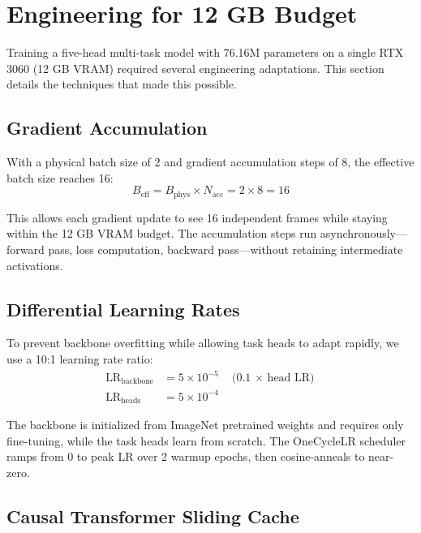 \documentclass[10pt,twocolumn]{article}
\begin{document}
\FloatBarrier

\section{Engineering for 12 GB Budget}
\label{sec:engineering}

Training a five-head multi-task model with 76.16M parameters on a single RTX 3060 (12 GB VRAM) required several engineering adaptations. This section details the techniques that made this possible.

\subsection{Gradient Accumulation}

With a physical batch size of 2 and gradient accumulation steps of 8, the effective batch size reaches 16:
\begin{equation}
B_{\text{eff}} = B_{\text{phys}} \times N_{\text{acc}} = 2 \times 8 = 16
\label{eq:batch}
\end{equation}

This allows each gradient update to see 16 independent frames while staying within the 12 GB VRAM budget. The accumulation steps run asynchronously---forward pass, loss computation, backward pass---without retaining intermediate activations.

\subsection{Differential Learning Rates}

To prevent backbone overfitting while allowing task heads to adapt rapidly, we use a 10:1 learning rate ratio:
\begin{align}
\text{LR}_{\text{backbone}} &= 5 \times 10^{-5} \quad \text{(0.1 $\times$ head LR)} \label{eq:lr-backbone}\\
\text{LR}_{\text{heads}} &= 5 \times 10^{-4} \label{eq:lr-heads}
\end{align}

The backbone is initialized from ImageNet pretrained weights and requires only fine-tuning, while the task heads learn from scratch. The OneCycleLR scheduler~\cite{smith2017superconvergence} ramps from 0 to peak LR over 2 warmup epochs, then cosine-anneals to near-zero.

\subsection{Causal Transformer Sliding Cache}
\end{document}
